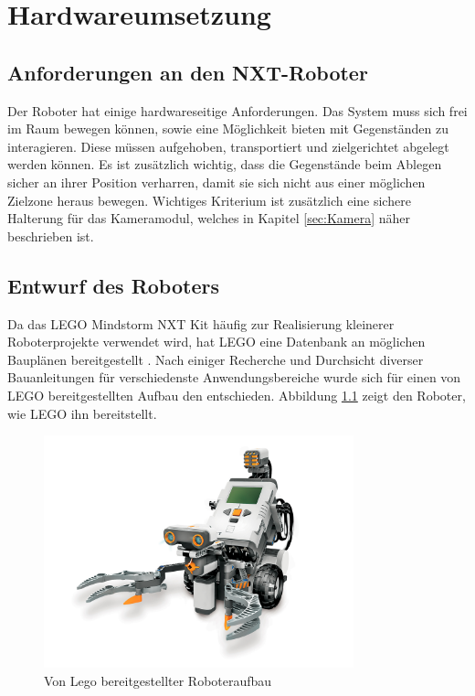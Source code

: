 \chapter{Hardwareumsetzung}
\label{cha:robot}
\section{Anforderungen an den NXT-Roboter}

Der Roboter hat einige hardwareseitige Anforderungen. Das System muss sich frei im Raum bewegen können, sowie eine Möglichkeit bieten mit Gegenständen zu interagieren. Diese müssen aufgehoben, transportiert und zielgerichtet abgelegt werden können. Es ist zusätzlich wichtig, dass die Gegenstände beim Ablegen sicher an ihrer Position verharren, damit sie sich nicht aus einer möglichen Zielzone heraus bewegen. Wichtiges Kriterium ist zusätzlich eine sichere Halterung für das Kameramodul, welches in Kapitel \ref{sec:Kamera} näher beschrieben ist.

\section{Entwurf des Roboters}

Da das LEGO Mindstorm NXT Kit häufig zur Realisierung kleinerer Roboterprojekte verwendet wird, hat LEGO eine Datenbank an möglichen Bauplänen bereitgestellt \cite{building_instructions}. Nach einiger Recherche und Durchsicht diverser Bauanleitungen für verschiedenste Anwendungsbereiche wurde sich für einen von LEGO bereitgestellten Aufbau den entschieden. Abbildung \ref{fig:standardRoboter} zeigt den Roboter, wie LEGO ihn bereitstellt.

\begin{figure}[h]
\centering
\includegraphics[width=0.8\textwidth]{Bilder/Robot/nxt_default}
\caption{Von Lego bereitgestellter Roboteraufbau}
\label{fig:standardRoboter}
\end{figure}


